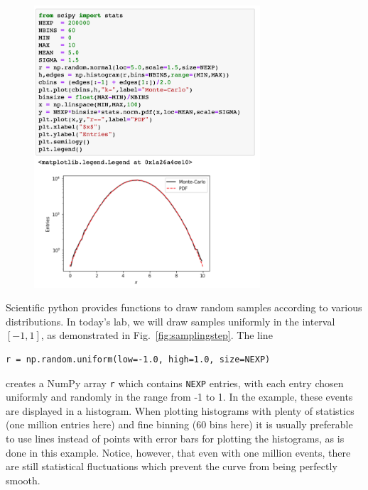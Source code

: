 \begin{figure}[htbp]
\begin{center}
\includegraphics[width=0.75\textwidth]{figs/labs/uncertainties/gaussian.png}\\ 
\end{center}
\caption{\label{fig:samplinggauss}}
\end{figure}

Scientific python provides functions to draw random samples according
to various distributions.  In today's lab, we will draw samples
uniformly in the interval $[-1,1]$, as demonstrated in Fig.~\ref{fig:samplingstep}.   The line
\begin{verbatim}
r = np.random.uniform(low=-1.0, high=1.0, size=NEXP)
\end{verbatim}
creates a NumPy array {\tt r} which contains {\tt NEXP} entries, with
each entry chosen uniformly and randomly in the range from -1 to 1.
In the example, these events are displayed in a histogram.  When
plotting histograms with plenty of statistics (one million entries
here) and fine binning (60 bins here) it is usually preferable to use
lines instead of points with error bars for plotting the histograms,
as is done in this example.  Notice, however, that even with one
million events, there are still statistical fluctuations which prevent
the curve from being perfectly smooth.

